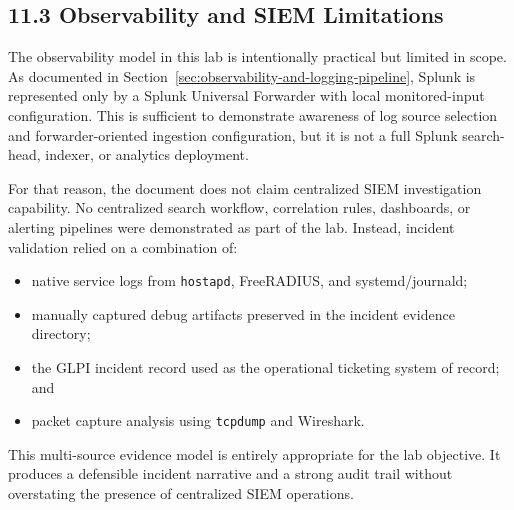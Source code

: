 \documentclass[11pt]{article}
\begin{document}

\subsection{11.3 Observability and SIEM Limitations}
\label{sec:observability-and-siem-limitations}

The observability model in this lab is intentionally practical but limited in scope. As documented in Section~\ref{sec:observability-and-logging-pipeline}, Splunk is represented only by a Splunk Universal Forwarder with local monitored-input configuration. This is sufficient to demonstrate awareness of log source selection and forwarder-oriented ingestion configuration, but it is not a full Splunk search-head, indexer, or analytics deployment.

For that reason, the document does not claim centralized SIEM investigation capability. No centralized search workflow, correlation rules, dashboards, or alerting pipelines were demonstrated as part of the lab. Instead, incident validation relied on a combination of:

\begin{itemize}
    \item native service logs from \texttt{hostapd}, FreeRADIUS, and systemd/journald;
    \item manually captured debug artifacts preserved in the incident evidence directory;
    \item the GLPI incident record used as the operational ticketing system of record; and
    \item packet capture analysis using \texttt{tcpdump} and Wireshark.
\end{itemize}

This multi-source evidence model is entirely appropriate for the lab objective. It produces a defensible incident narrative and a strong audit trail without overstating the presence of centralized SIEM operations.
\end{document}
